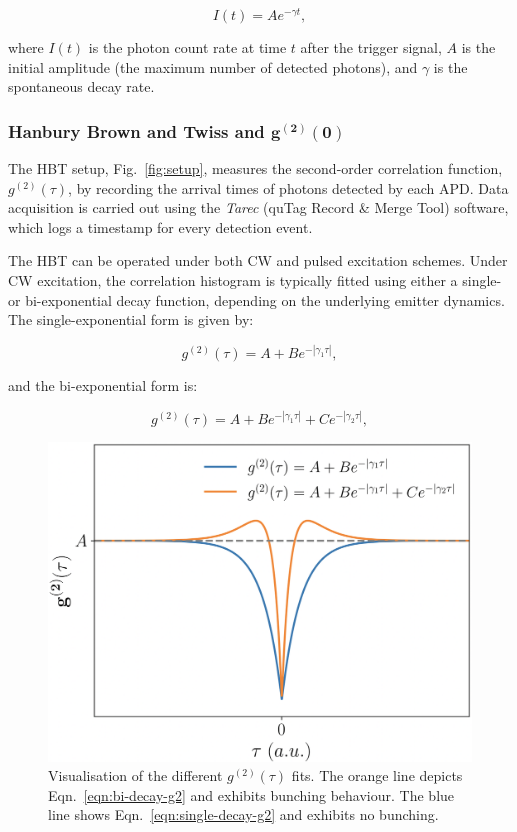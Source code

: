 \begin{equation}
    I(t) = A e^{-\gamma t},
    \label{eqn:lifetime}
\end{equation}

where $I(t)$ is the photon count rate at time $t$ after the trigger signal, $A$ is the initial amplitude (the maximum number of detected photons), and $\gamma$ is the spontaneous decay rate.


\subsubsection[Hanbury-Brown and Twiss]{Hanbury Brown and Twiss and $\mathbf{g^{(2)}(0)}$} \label{sec:g2}


The HBT setup, Fig.~\ref{fig:setup}, measures the second-order correlation function, $g^{(2)}(\tau)$, by recording the arrival times of photons detected by each APD. Data acquisition is carried out using the \textit{Tarec} (quTag Record \& Merge Tool) software, which logs a timestamp for every detection event. 

The HBT can be operated under both CW and pulsed excitation schemes. Under CW excitation, the correlation histogram is typically fitted using either a single- or bi-exponential decay function, depending on the underlying emitter dynamics. The single-exponential form is given by:

\begin{equation}
    g^{(2)}(\tau) = A + B e^{-\left| \gamma_1\tau \right|},
    \label{eqn:single-decay-g2}
\end{equation}

and the bi-exponential form is:

\begin{equation}
    g^{(2)}(\tau) = A + B e^{-\left| \gamma_1\tau \right|} + C e^{-\left| \gamma_2\tau \right|},
    \label{eqn:bi-decay-g2}
\end{equation}

\begin{figure}[h]
    \centering
    \includegraphics[width=0.7\linewidth]{Figures/g2Visualisation.png}
    \caption{Visualisation of the different $g^{(2)}(\tau)$ fits. The orange line depicts Eqn.~\ref{eqn:bi-decay-g2} and exhibits bunching behaviour. The blue line shows Eqn.~\ref{eqn:single-decay-g2} and exhibits no bunching.}
    \label{fig:g2-visualisation}
\end{figure}

